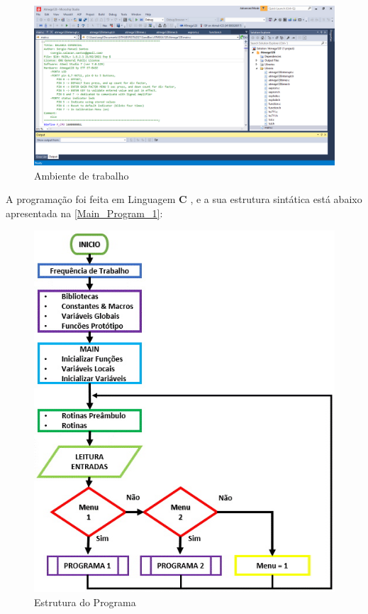 \begin{figure}[H]
	\centering
	\includegraphics[width=\linewidth]{./image/PESTA/IDE/Work-Space.png}
	\caption{Ambiente de trabalho}
	\label{Work-Space}
\end{figure}
A programação foi feita em Linguagem \textbf{C} \cite{book-11}, e a sua estrutura sintática está abaixo apresentada na \autoref{Main_Program_1}:
\emptyline
\begin{figure}[H]
	\centering
	\includegraphics[scale=1]{./image/PESTA/flowchart/Main-Program-1.jpg}
	\caption{Estrutura do Programa}
	\label{Main_Program_1}
\end{figure}
